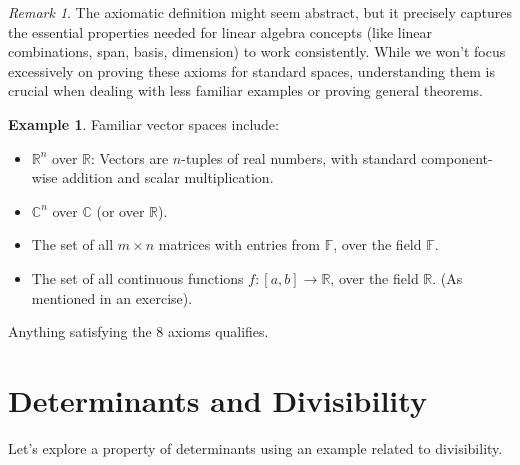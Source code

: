 \documentclass[11pt]{article}
\theoremstyle{definition}
\newtheorem{example}[theorem]{Example}
\theoremstyle{remark}
\newtheorem{remark}[theorem]{Remark}
\newcommand{\field}[1]{\mathbb{#1}} %
\newcommand{\R}{\field{R}}
\newcommand{\C}{\field{C}}
\newcommand{\F}{\field{F}} %
\begin{document}
\begin{remark}
The axiomatic definition might seem abstract, but it precisely captures the essential properties needed for linear algebra concepts (like linear combinations, span, basis, dimension) to work consistently. While we won't focus excessively on proving these axioms for standard spaces, understanding them is crucial when dealing with less familiar examples or proving general theorems.
\end{remark}

\begin{example}
Familiar vector spaces include:
\begin{itemize}
    \item $\R^n$ over $\R$: Vectors are $n$-tuples of real numbers, with standard component-wise addition and scalar multiplication.
    \item $\C^n$ over $\C$ (or over $\R$).
    \item The set of all $m \times n$ matrices with entries from $\F$, over the field $\F$.
    \item The set of all continuous functions $f: [a,b] \to \R$, over the field $\R$. (As mentioned in an exercise).
\end{itemize}
Anything satisfying the 8 axioms qualifies.
\end{example}

\section{Determinants and Divisibility}

Let's explore a property of determinants using an example related to divisibility.
\end{document}
